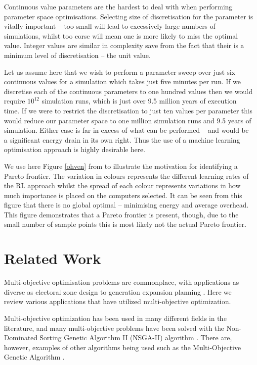 \documentclass[10pt, conference, compsocconf]{IEEEtran}
\begin{document}
Continuous value parameters are the hardest to deal with when performing parameter space optimisations. Selecting size of discretisation for the parameter is vitally important -- too small will lead to excessively large numbers of simulations, whilst too corse will mean one is more likely to miss the optimal value. Integer values are similar in complexity save from the fact that their is a minimum level of discretisation -- the unit value. 

Let us assume here that we wish to perform a parameter sweep over just six continuous values for a simulation which takes just five minutes per run. If we discretise each of the continuous parameters to one hundred values then we would require $10^{12}$ simulation runs, which is just over 9.5 million years of execution time. If we were to restrict the discretisation to just ten values per parameter this would reduce our parameter space to one million simulation runs and 9.5 years of simulation. Either case is far in excess of what can be performed -- and would be a significant energy drain in its own right. Thus the use of a machine learning optimisation approach is highly desirable here.

We use here Figure \ref{ohven} from \cite{suscom} to illustrate the motivation for identifying a Pareto frontier. The variation in colours represents the different learning rates of the RL approach whilst the spread of each colour represents variations in how much importance is placed on the computers selected. It can be seen from this figure that there is no global optimal -- minimising energy and average overhead. This figure demonstrates that a Pareto frontier is present, though, due to the small number of sample points this is most likely not the actual Pareto frontier.



\section{Related Work}
\label{relatedWork}

Multi-objective optimisation problems are commonplace, with applications as diverse as electoral zone design \cite{Ponsich2017} to generation expansion planning \cite{Kannan2009}. Here we review various applications that have utilized multi-objective optimization.

Multi-objective optimization has been used in many different fields in the literature, and many multi-objective problems have been solved with the Non-Dominated Sorting Genetic Algorithm II (NSGA-II) algorithm \cite{Valkanas2014}. There are, however, examples of other algorithms being used such as the Multi-Objective Genetic Algorithm \cite{T.MurataandH.Ishibuchi1995}.
\end{document}
